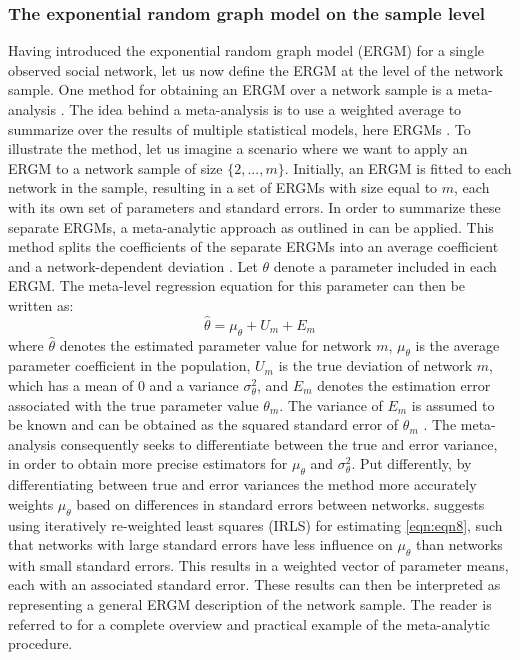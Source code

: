 \documentclass[a4paper, man]{apa6}
\begin{document}
\subsubsection{The exponential random graph model on the sample level}
Having introduced the exponential random graph model (ERGM) for a single observed social network, let us now define the ERGM at the level of the network sample. One method for obtaining an ERGM over a network sample is a meta-analysis \cite{lubbers2003group}. The idea behind a meta-analysis is to use a weighted average to summarize over the results of multiple statistical models, here ERGMs \cite{lubbers2003group}. To illustrate the method, let us imagine a scenario where we want to apply an ERGM to a network sample of size $\{2, ..., m\}$. \clearpage \noindent Initially, an ERGM is fitted to each network in the sample, resulting in a set of ERGMs with size equal to $m$, each with its own set of parameters and standard errors. In order to summarize these separate ERGMs, a meta-analytic approach as outlined in  can be applied. This method splits the coefficients of the separate ERGMs into an average coefficient and a network-dependent deviation \cite{lubbers2003group}. Let $\theta$ denote a parameter included in each ERGM. The meta-level regression equation for this parameter can then be written as: \begin{equation} \label{eqn:eqn8} \hat{\theta} = \mu_{\theta} + U_{m} + E_{m} \end{equation} where $\hat{\theta}$ denotes the estimated parameter value for network $m$, $\mu_{\theta}$ is the average parameter coefficient in the population, $U_{m}$ is the true deviation of network $m$, which has a mean of 0 and a variance $\sigma^{2}_{\theta}$, and $E_{m}$ denotes the estimation error associated with the true parameter value $\theta_{m}$. The variance of $E_{m}$ is assumed to be known and can be obtained as the squared standard error of $\theta_{m}$ \cite{lubbers2003group}. The meta-analysis consequently seeks to differentiate between the true and error variance, in order to obtain more precise estimators for $\mu_{\theta}$ and $\sigma^{2}_{\theta}$. Put differently, by differentiating between true and error variances the method more accurately weights $\mu_{\theta}$ based on differences in standard errors between networks.  suggests using iteratively re-weighted least squares (IRLS) for estimating \eqref{eqn:eqn8}, such that networks with large standard errors have less influence on $\mu_{\theta}$ than networks with small standard errors. This results in a weighted vector of parameter means, each with an associated standard error. These results can then be interpreted as representing a general ERGM description of the network sample. The reader is referred to  for a complete overview and practical example of the meta-analytic procedure.
\\
\end{document}
